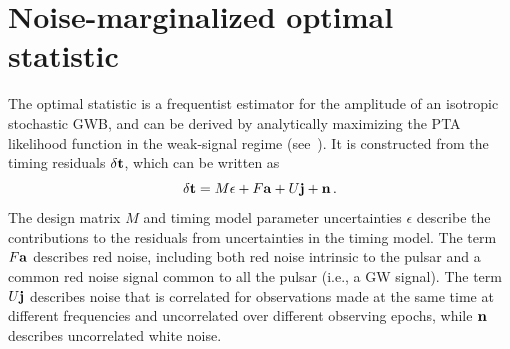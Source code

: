 \documentclass[twocolumn,aps,prd,superscriptaddress]{revtex4-1}
\newcommand{\res}{\ensuremath{\delta {\bf t}}}
\begin{document}
\section{Noise-marginalized optimal statistic}
\label{sec:marg_os}

The optimal statistic is a frequentist estimator 
for the amplitude of an isotropic stochastic GWB, 
and can be derived by analytically maximizing 
the PTA likelihood function in the weak-signal regime (see~\citet{abc+2009}). 
It is constructed from the timing residuals $\res$, 
which can be written as 
\begin{equation}
	\res = M {\bf{\epsilon}} + F {\bf{a}} + U {\bf{j}} + {\bf{n}} \,.
\end{equation}
The design matrix $M$ and timing model parameter uncertainties $\epsilon$ 
describe the contributions to the residuals from uncertainties in the timing model. 
The term $F{\bf{a}}$ describes red noise, 
including both red noise intrinsic to the pulsar 
and a common red noise signal common to all the pulsar (i.e., a GW signal). 
The term $U{\bf{j}}$ describes noise that is correlated for observations made at the same time 
at different frequencies and uncorrelated over different observing epochs, 
while ${\bf{n}}$ describes uncorrelated white noise.
\end{document}
